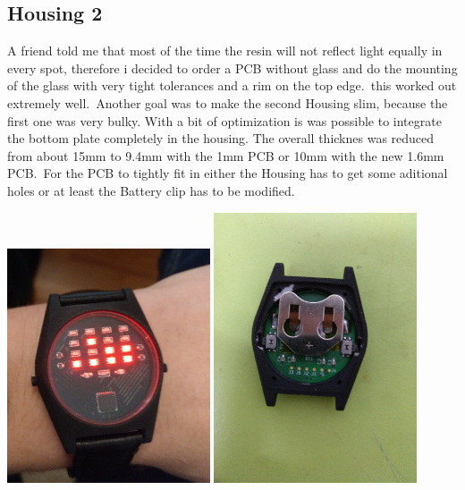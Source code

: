 \subsection{Housing 2}
A friend told me that most of the time the resin will not reflect light equally in every spot, therefore i decided to order a PCB without glass and do the mounting of the glass with very tight tolerances and a rim on the top edge.\
this worked out extremely well.\
Another goal was to make the second Housing slim, because the first one was very bulky. With a bit of optimization is was possible to integrate the bottom plate completely in the housing. The overall thicknes was reduced from about 15mm to 9.4mm with the 1mm PCB or 10mm with the new 1.6mm PCB.\
For the PCB to tightly fit in either the Housing has to get some aditional holes or at least the Battery clip has to be modified.\
\begin{center}
\includegraphics[width=0.45\textwidth]{../Pictures/Housing2.jpg} \includegraphics[width=0.45\textwidth]{../Pictures/Housing3b.jpg}
\end{center}
